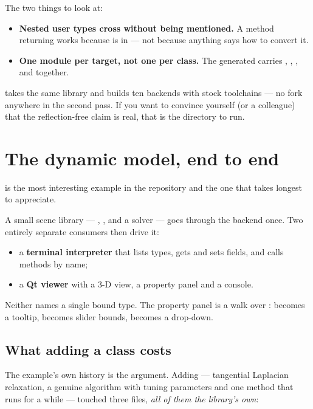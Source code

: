 The two things to look at:

\begin{itemize}
  \item \textbf{Nested user types cross without being mentioned.} A
     method returning  works because
     is in  --- not because anything says how to
    convert it.
  \item \textbf{One module per target, not one per class.} The generated
     carries , , ,
     and  together.
\end{itemize}

 takes the same library and builds ten backends
with stock toolchains --- no fork anywhere in the second pass. If you want to
convince yourself (or a colleague) that the reflection-free claim is real, that
is the directory to run.

\section{The dynamic model, end to end}

 is the most interesting example in the repository and
the one that takes longest to appreciate.

A small scene library --- , , and a  solver
--- goes through the  backend once. Two entirely separate
consumers then drive it:

\begin{itemize}
  \item a \textbf{terminal interpreter} that lists types, gets and sets fields,
    and calls methods by name;
  \item a \textbf{Qt viewer} with a 3-D view, a property panel and a console.
\end{itemize}

Neither names a single bound type. The property panel is a walk over
:  becomes a tooltip,  becomes slider
bounds,  becomes a drop-down.

\subsection*{What adding a class costs}

The example's own history is the argument. Adding  ---
tangential Laplacian relaxation, a genuine algorithm with tuning parameters and
one method that runs for a while --- touched three files, \emph{all of them the
library's own}:

